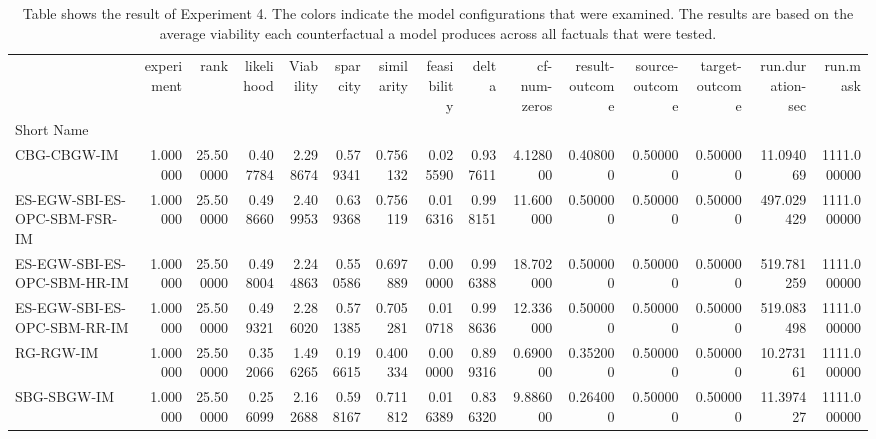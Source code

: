 \begin{table}
\caption{Table shows the result of Experiment 4. The colors indicate the model configurations that were examined. The results are based on the average viability each counterfactual a model produces across all factuals that were tested.}
\label{tbl:exp4-winner}
\begin{tabular}{lrrrrrrrrrrrrrr}
 & experiment & rank & likelihood & Viability & sparcity & similarity & feasibility & delta & cf-num-zeros & result-outcome & source-outcome & target-outcome & run.duration-sec & run.mask \\
Short Name &  &  &  &  &  &  &  &  &  &  &  &  &  &  \\
CBG-CBGW-IM & 1.000000 & 25.500000 & 0.407784 & 2.298674 & 0.579341 & 0.756132 & 0.025590 & 0.937611 & 4.128000 & 0.408000 & 0.500000 & 0.500000 & 11.094069 & 1111.000000 \\
ES-EGW-SBI-ES-OPC-SBM-FSR-IM & 1.000000 & 25.500000 & 0.498660 & 2.409953 & 0.639368 & 0.756119 & 0.016316 & 0.998151 & 11.600000 & 0.500000 & 0.500000 & 0.500000 & 497.029429 & 1111.000000 \\
ES-EGW-SBI-ES-OPC-SBM-HR-IM & 1.000000 & 25.500000 & 0.498004 & 2.244863 & 0.550586 & 0.697889 & 0.000000 & 0.996388 & 18.702000 & 0.500000 & 0.500000 & 0.500000 & 519.781259 & 1111.000000 \\
ES-EGW-SBI-ES-OPC-SBM-RR-IM & 1.000000 & 25.500000 & 0.499321 & 2.286020 & 0.571385 & 0.705281 & 0.010718 & 0.998636 & 12.336000 & 0.500000 & 0.500000 & 0.500000 & 519.083498 & 1111.000000 \\
RG-RGW-IM & 1.000000 & 25.500000 & 0.352066 & 1.496265 & 0.196615 & 0.400334 & 0.000000 & 0.899316 & 0.690000 & 0.352000 & 0.500000 & 0.500000 & 10.273161 & 1111.000000 \\
SBG-SBGW-IM & 1.000000 & 25.500000 & 0.256099 & 2.162688 & 0.598167 & 0.711812 & 0.016389 & 0.836320 & 9.886000 & 0.264000 & 0.500000 & 0.500000 & 11.397427 & 1111.000000 \\
\end{tabular}
\end{table}
